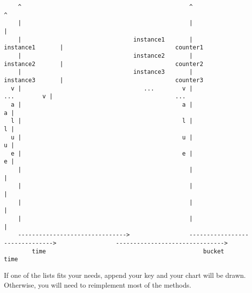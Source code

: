 \documentclass[a4paper,11pt]{article}
\begin{document}
\begin{lstlisting}
    ^                                                ^                                                ^                                                         
    |                                                |                                                |                                                         
    |                                instance1       |                                instance1       |                                counter1                
    |                                instance2       |                                instance2       |                                counter2                
    |                                instance3       |                                instance3       |                                counter3                
  v |                                   ...        v |                                   ...        v |                                   ...                   
  a |                                              a |                                              a |                                                         
  l |                                              l |                                              l |                                                         
  u |                                              u |                                              u |                                                         
  e |                                              e |                                              e |                                                         
    |                                                |                                                |                                                         
    |                                                |                                                |                                                         
    |                                                |                                                |                                                         
    |                                                |                                                |                                                         
    ------------------------------->                 ------------------------------->                 ------------------------------->                          
        time                                             bucket                                           time                                                  
\end{lstlisting}
If one of the lists fits your needs, append your key and your chart will be drawn. Otherwise, you will need to reimplement most of the methods. 
\bigskip
\end{document}
